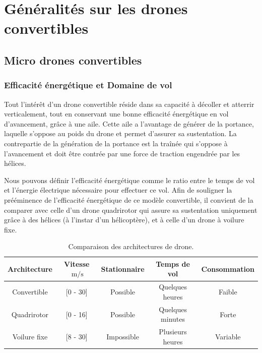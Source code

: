 \chapter{Généralités sur les drones convertibles}
\minitoc
\label{chap:generalites}


\section{Micro drones convertibles}

    \subsection{Efficacité énergétique et Domaine de vol} 
    Tout l'intérêt d'un drone convertible réside dans sa capacité à décoller et atterrir verticalement, tout en conservant une bonne efficacité énergétique en vol d'avancement, grâce à une aile. Cette aile a l'avantage de générer de la portance, laquelle s'oppose au poids du drone et permet d'assurer sa sustentation. La contrepartie de la génération de la portance est la traînée qui s'oppose à l'avancement et doit être contrée par une force de traction engendrée par les hélices. 
    
     Nous pouvons définir l'efficacité énergétique comme le ratio entre le temps de vol et l'énergie électrique nécessaire pour effectuer ce vol. Afin de souligner la prééminence de l'efficacité énergétique de ce modèle convertible, il convient de la comparer avec celle d'un drone quadrirotor qui assure sa sustentation uniquement grâce à des hélices (à l'instar d'un hélicoptère), et à celle d'un drone à voilure fixe.
    \begin{table}[ht]
        \centering
        \begin{tabular}{|c|c|c|c|c|}
            \hline
            Architecture & Vitesse $\SI{}{\meter\per\second}$  & Stationnaire & Temps de vol & Consommation\\
            \hline \hline
            Convertible & [0 - 30] & Possible & Quelques heures & Faible\\
            \hline
            Quadrirotor & [0 - 16] & Possible& Quelques minutes & Forte\\
            \hline
            Voilure fixe & [8 - 30] & Impossible & Plusieurs heures & Variable \\
            \hline
        \end{tabular}
        \caption{Comparaison des architectures de drone.}
    \end{table}

